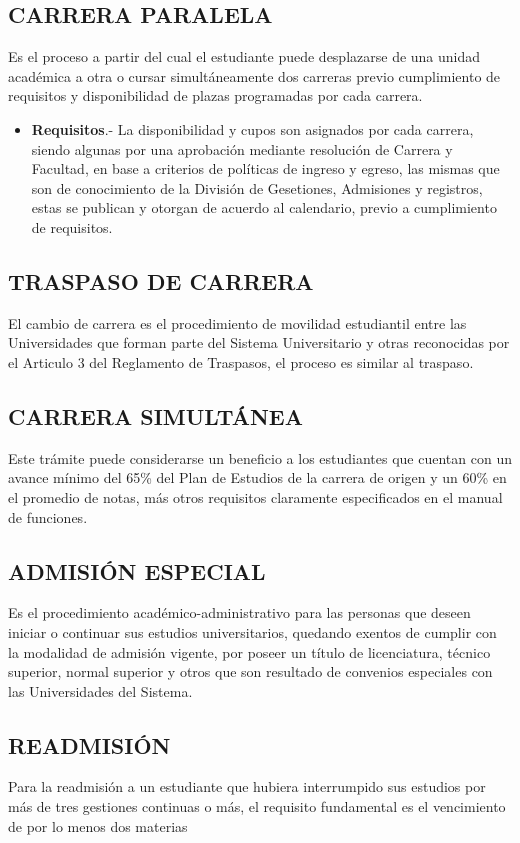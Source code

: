 \documentclass[letter, openright, 12pt]{book}
\begin{document}
\subsection{CARRERA PARALELA}
Es el proceso a partir del cual el estudiante puede desplazarse de una unidad académica a otra o cursar simultáneamente dos carreras previo cumplimiento de requisitos y disponibilidad de plazas programadas por cada carrera.
\begin{itemize}
\item \textbf{Requisitos}.- La disponibilidad y cupos son asignados por cada carrera, siendo algunas por una aprobación mediante resolución de Carrera y Facultad, en base a criterios de políticas de ingreso y egreso, las mismas que son de conocimiento de la División de Gesetiones, Admisiones y registros, estas se publican y otorgan de acuerdo al calendario, previo a cumplimiento de requisitos.
\end{itemize}

\subsection{TRASPASO DE CARRERA}
El cambio de carrera es el procedimiento de movilidad estudiantil entre las Universidades que forman parte del Sistema Universitario y otras reconocidas por el Articulo 3 del Reglamento de Traspasos, el proceso es similar al traspaso. 

\subsection{CARRERA SIMULTÁNEA}
Este trámite puede considerarse un beneficio a los estudiantes que cuentan con un avance mínimo del 65\% del Plan de Estudios de la carrera de origen y un 60\% en el promedio de notas, más otros requisitos claramente especificados en el manual de funciones. 

\subsection{ADMISIÓN ESPECIAL}
Es el procedimiento académico-administrativo para las personas que deseen iniciar o continuar sus estudios universitarios, quedando exentos de cumplir con la modalidad de admisión vigente, por poseer un título de licenciatura, técnico superior, normal superior y otros que son resultado de convenios especiales con las Universidades del Sistema. 

\subsection{READMISIÓN}
Para la readmisión a un estudiante que hubiera interrumpido sus estudios por más de tres gestiones continuas o más, el requisito fundamental es el vencimiento de por lo menos dos materias
\end{document}

